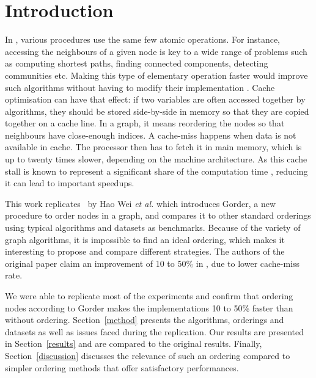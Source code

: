 
\section{Introduction}

In \field, various procedures use the same few atomic operations. For instance, accessing the neighbours of a given node is key to a wide range of problems such as computing shortest paths, finding connected components, detecting communities etc. Making this type of elementary operation faster would improve such algorithms without having to modify their implementation \cite{gorder}.
Cache optimisation can have that effect: if two variables are often accessed together by algorithms, they should be stored side-by-side in memory so that they are copied together on a cache line. In a graph, it means reordering the nodes so that neighbours have close-enough indices. A cache-miss happens when data is not available in cache. The processor then has to fetch it in main memory, which is up to twenty times slower, depending on the machine architecture. As this cache stall is known to represent a significant share of the computation time \cite{cache,cache2}, reducing it can lead to important speedups.

This work replicates~\cite{gorder} by Hao Wei \textit{et al.} which introduces Gorder, a new procedure to order nodes in a graph, and compares it to other standard orderings using typical algorithms and datasets as benchmarks. Because of the variety of graph algorithms, it is impossible to find an ideal ordering, which makes it interesting to propose and compare different strategies. The authors of the original paper claim an improvement of 10 to 50\% in \runtime, due to lower cache-miss rate.

We were able to replicate most of the experiments and confirm that ordering nodes according to Gorder makes the implementations 10 to 50\% faster than without ordering.
%
Section~\ref{method} presents the algorithms, orderings and datasets as well as issues faced during the replication. Our results are presented in Section~\ref{results} and are compared to the original results. Finally, Section~\ref{discussion} discusses the relevance of such an ordering compared to simpler ordering methods that offer satisfactory performances.

